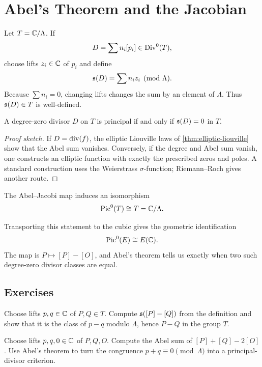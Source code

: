 \chapter{Abel's Theorem and the Jacobian}
\label{ch:abel-jacobian}

Let \(T=\mathbb{C}/\Lambda\).  If
\[
  D=\sum n_i[p_i]\in\operatorname{Div}^0(T),
\]
choose lifts \(z_i\in\mathbb{C}\) of \(p_i\) and define
\[
  \mathfrak{s}(D)=\sum n_i z_i \pmod{\Lambda}.
\]
Because \(\sum n_i=0\), changing lifts changes the sum by an element of
\(\Lambda\).  Thus \(\mathfrak{s}(D)\in T\) is well-defined.

\begin{theorem}
\label{thm:abel-torus-new}
A degree-zero divisor \(D\) on \(T\) is principal if and only if
\(\mathfrak{s}(D)=0\) in \(T\).
\end{theorem}

\begin{proof}[Proof sketch]
If \(D=\operatorname{div}(f)\), the elliptic Liouville laws of
\cref{thm:elliptic-liouville} show that the Abel sum vanishes.  Conversely, if
the degree and Abel sum vanish, one constructs an elliptic function with exactly
the prescribed zeros and poles.  A standard construction uses the Weierstrass
\(\sigma\)-function; Riemann--Roch gives another route.
\end{proof}

\begin{corollary}
\label{cor:pic-torus}
The Abel--Jacobi map induces an isomorphism
\[
  \operatorname{Pic}^0(T)\cong T=\mathbb{C}/\Lambda.
\]
\end{corollary}

Transporting this statement to the cubic gives the geometric identification
\[
  \operatorname{Pic}^0(E)\cong E(\mathbb{C}).
\]
The map is \(P\mapsto[P]-[O]\), and Abel's theorem tells us exactly when two such
degree-zero divisor classes are equal.

\section*{Exercises}

\begin{exercise}
Choose lifts \(p,q\in\mathbb{C}\) of \(P,Q\in T\).  Compute
\(\mathfrak{s}([P]-[Q])\) from the definition and show that it is the class of
\(p-q\) modulo \(\Lambda\), hence \(P-Q\) in the group \(T\).
\end{exercise}

\begin{exercise}
Choose lifts \(p,q,0\in\mathbb{C}\) of \(P,Q,O\).  Compute the Abel sum of
\([P]+[Q]-2[O]\).  Use Abel's theorem to turn the congruence
\(p+q\equiv0\pmod{\Lambda}\) into a principal-divisor criterion.
\end{exercise}

